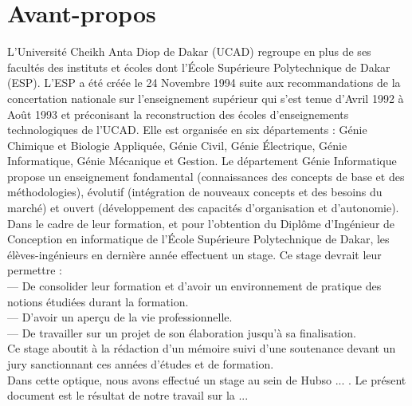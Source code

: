 %
%
%
%
%
%
\chapter*{Avant-propos}
\begin{SingleSpace}

L’Université Cheikh Anta Diop de Dakar (UCAD) regroupe en plus de ses facultés des instituts
et écoles dont l’École Supérieure Polytechnique de Dakar (ESP). L’ESP a été créée le 24 Novembre
1994 suite aux recommandations de la concertation nationale sur l’enseignement supérieur qui
s’est tenue d’Avril 1992 à Août 1993 et préconisant la reconstruction des écoles d’enseignements
technologiques de l’UCAD. Elle est organisée en six départements : Génie Chimique et Biologie
Appliquée, Génie Civil, Génie Électrique, Génie Informatique, Génie Mécanique et Gestion.
Le département Génie Informatique propose un enseignement fondamental (connaissances
des concepts de base et des méthodologies), évolutif (intégration de nouveaux concepts et des
besoins du marché) et ouvert (développement des capacités d’organisation et d’autonomie).
Dans le cadre de leur formation, et pour l’obtention du Diplôme d’Ingénieur de Conception
en informatique de l’École Supérieure Polytechnique de Dakar, les élèves-ingénieurs en dernière
année effectuent un stage. Ce stage devrait leur permettre :
\\— De consolider leur formation et d’avoir un environnement de pratique des notions étudiées
durant la formation.
\\— D’avoir un aperçu de la vie professionnelle.
\\— De travailler sur un projet de son élaboration jusqu’à sa finalisation.
\\Ce stage aboutit à la rédaction d’un mémoire suivi d’une soutenance devant un jury sanctionnant
ces années d’études et de formation.
\\Dans cette optique, nous avons effectué un stage au sein de Hubso ... . Le présent document
est le résultat de notre travail sur la ...

\end{SingleSpace}
